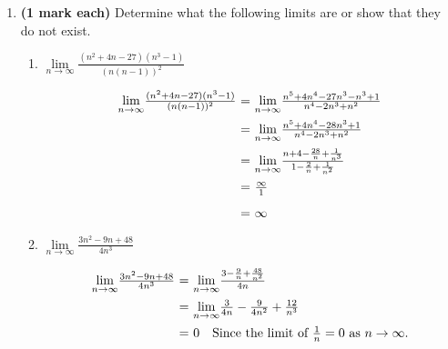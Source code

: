 \documentclass[12pt]{report}
\begin{document}
\begin{enumerate}[leftmargin=\labelsep]
    \item {\bf (1 mark each)} Determine what the following limits are or show that they do not exist.
        \begin{enumerate}
            \item $ {\lim \limits_{{n\rightarrow \infty}}} \frac{(n^2+4 n-27)(n^3-1)}{(n(n-1))^2} $
                \begin{tcolorbox}
                    \begin{equation*}
                        \begin{array}{r@{~=~}l}
                            {\lim \limits_{{n\rightarrow \infty}}} \frac{(n^2+4 n-27)(n^3-1)}{(n(n-1))^2} & {\lim \limits_{{n\rightarrow \infty}}} \frac{n^5+4n^4-27n^3-n^3+1}{n^4-2n^3+n^2} \\ [2ex]
                            & {\lim \limits_{{n\rightarrow \infty}}} \frac{n^5+4n^4-28n^3+1}{n^4-2n^3+n^2} \\ [2ex]
                            & {\lim \limits_{{n\rightarrow \infty}}} \frac{n+4-\frac{28}{n}+\frac{1}{n^3}}{1-\frac{2}{n}+\frac{1}{n^2}} \\ [2ex]
                            & \frac{\infty}{1} \\ [2ex]
                            & \infty
                        \end{array}
                    \end{equation*}
                \end{tcolorbox}
            \item $\lim \limits_{n\rightarrow \infty} \frac{3n^2-9n + 48}{4n^3}$
                \begin{tcolorbox}
                    \begin{equation*}
                        \begin{array}{r@{~=~}l}
                            {\lim \limits_{{n\rightarrow \infty}}} \frac{3n^2-9n + 48}{4n^3} & {\lim \limits_{{n\rightarrow \infty}}} \frac{3-\frac{9}{n} + \frac{48}{n^2}}{4n} \\ [2ex]
                            & {\lim \limits_{{n\rightarrow \infty}}} \frac{3}{4n} - \frac{9}{4n^2} + \frac{12}{n^3} \\ [2ex]
                            & 0 \quad \text{Since the limit of } \frac{1}{n} = 0 \text{ as } n \rightarrow \infty.
                        \end{array}
                    \end{equation*}
                \end{tcolorbox}

\end{enumerate}
\end{enumerate}
\end{document}
